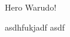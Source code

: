 \documentclass{article}
\begin{document}

Hero Warudo!

\abstract asdhfukjadf  asdf 
\end{document}
